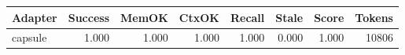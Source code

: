 \begin{tabular}{lrrrrrrr}
\hline
Adapter & Success & MemOK & CtxOK & Recall & Stale & Score & Tokens \\
\hline
capsule & 1.000 & 1.000 & 1.000 & 1.000 & 0.000 & 1.000 & 10806 \\
\hline
\end{tabular}
